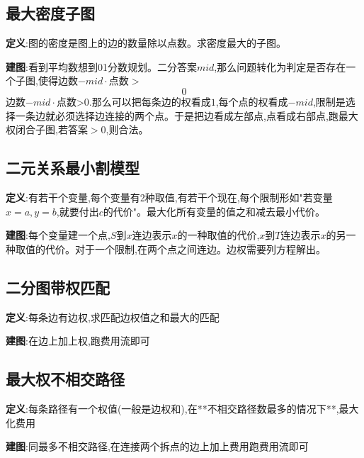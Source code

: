 \documentclass[12pt, a4paper, oneside]{ctexart}
\begin{document}
\subsection{最大密度子图}
\textbf{定义}:图的密度是图上的边的数量除以点数。求密度最大的子图。\par
\textbf{建图}:看到平均数想到01分数规划。二分答案$mid$,那么问题转化为判定是否存在一个子图,使得边数−$mid\cdot$点数$>$$$0$$边数−$mid \cdot$点数>$0$.那么可以把每条边的权看成$1$,每个点的权看成$−mid$,限制是选择一条边就必须选择边连接的两个点。于是把边看成左部点,点看成右部点,跑最大权闭合子图,若答案$>0$,则合法。


\subsection{二元关系最小割模型}
\textbf{定义}:有若干个变量,每个变量有2种取值,有若干个现在,每个限制形如"若变量$x=a,y=b$,就要付出$c$的代价"。最大化所有变量的值之和减去最小代价。\par
\textbf{建图}:每个变量建一个点,$S$到$x$连边表示$x$的一种取值的代价,$x$到$T$连边表示$x$的另一种取值的代价。对于一个限制,在两个点之间连边。边权需要列方程解出。


\subsection{二分图带权匹配}
\textbf{定义}:每条边有边权,求匹配边权值之和最大的匹配\par
\textbf{建图}:在边上加上权,跑费用流即可


\subsection{最大权不相交路径}
\textbf{定义}:每条路径有一个权值(一般是边权和),在**不相交路径数最多的情况下**,最大化费用\par
\textbf{建图}:同最多不相交路径,在连接两个拆点的边上加上费用跑费用流即可
\end{document}
